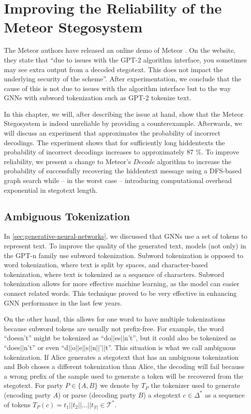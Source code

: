 \chapter{Improving the Reliability of the Meteor Stegosystem}
\label{chap:reliability}

The Meteor authors have released an online demo of Meteor \cite{MeteorDemo2021}.
On the website, they state that ``due to issues with the GPT-2 algorithm interface, you sometimes may see extra output from a decoded stegotext. This does not impact the underlying security of the scheme''.
After experimentation, we conclude that the cause of this is not due to issues with the algorithm interface but to the way GNNs with subword tokenization such as GPT-2 tokenize text.

In this chapter, we will, after describing the issue at hand, show that the Meteor Stegosystem is indeed unreliable by providing a counterexample.
Afterwards, we will discuss an experiment that approximates the probability of incorrect decodings.
The experiment shows that for sufficiently long hiddentexts the probability of incorrect decodings increases to approximately 87 \%.
To improve reliability, we present a change to Meteor's $Decode$ algorithm to increase the probability of successfully recovering the hiddentext message using a DFS-based graph search while -- in the worst case -- introducing computational overhead exponential in stegotext length.

\section{Ambiguous Tokenization}
\label{sec:amb-tok}

In \autoref{sec:generative-neural-networks}, we discussed that GNNs use a set of tokens to represent text.
To improve the quality of the generated text, models (not only) in the GPT-n family use subword tokenization.
Subword tokenization is opposed to word tokenization, where text is split by spaces, and character-based tokenization, where text is tokenized as a sequence of characters.
Subword tokenization allows for more effective machine learning, as the model can easier connect related words.
This technique proved to be very effective in enhancing GNN performance in the last few years.

On the other hand, this allows for one word to have multiple tokenizations because subword tokens are usually not prefix-free.
For example, the word ``doesn't'' might be tokenized as ``do$||$es$||$n't'', but it could also be tokenized as ``does$||$n't'' or even ``d$||$o$||$e$||$s$||$n$||$'$||$t''.
This situation is what we call ambiguous tokenization.
If Alice generates a stegotext that has an ambiguous tokenization and Bob choses a different tokenization than Alice, the decoding will fail because a wrong prefix of the sample used to generate a token will be recovered from the stegotext.
For party $P \in \{A,B\}$ we denote by $T_P$ the tokenizer used to generate (encoding party $A$) or parse (decoding party $B$) a stegotext $c \in \Delta^*$ as a sequence of tokens $T_P(c) = t_1||t_2||\dots||t_{|t|} \in \mathcal{T}^*$.

